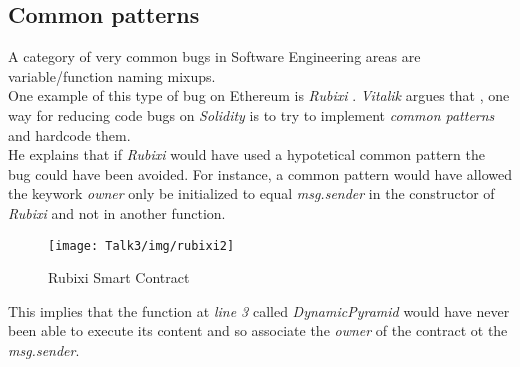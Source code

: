 \subsection{Common patterns}
A category of very common bugs in Software Engineering areas are variable/function naming mixups. \\
One example of this type of bug on Ethereum is \textit{Rubixi} \cite{rubixi1}. \textit{Vitalik} argues that \cite{challenge2}, one way for reducing code bugs on \textit{Solidity} is to try to implement \textit{common patterns} and hardcode them. \\
He explains that if \textit{Rubixi} would have used a hypotetical common pattern the bug could have been avoided. 
For instance, a common pattern would have allowed the keywork \textit{owner} only be initialized to equal \textit{msg.sender} in the constructor of \textit{Rubixi} and not in another function. 
\begin{figure}[H]
\begin{center}
\texttt{[image: Talk3/img/rubixi2]}
\end{center}
\caption{Rubixi Smart Contract}
\label{label}
\end{figure}

This implies that the function at \textit{line 3} called \textit{DynamicPyramid} would have never been able to execute its content and so associate the \textit{owner} of the contract ot the \textit{msg.sender}.

